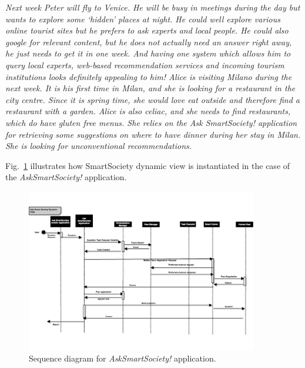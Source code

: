 \textit{Next week Peter will fly to Venice. He will be busy in meetings during the day but wants to explore some ‘hidden’ places at night. He could well explore various online tourist sites but he prefers to ask experts and local people. He could also google for relevant content, but he does not actually need an answer right away, he just needs to get it in one week. And having one system which allows him to query local experts, web-based recommendation services and incoming tourism institutions looks definitely appealing to him!
Alice is visiting Milano during the next week. It is his first time in Milan, and she is looking for a restaurant in the city centre. Since it is spring time, she would love eat outside and therefore  find a restaurant with a garden. Alice is also celiac, and she needs to find restaurants, which do have gluten free menus. She relies on the Ask SmartSociety! application for retrieving some suggestions on where to have dinner during her stay in Milan. She is looking for unconventional recommendations.}

Fig.~\ref{fig:dynamic_ask} illustrates how SmartSociety dynamic view is instantiated in the case of the \textit{AskSmartSociety!} application.

\begin{figure}[!hbt]
\centering
\includegraphics[width=0.9\textwidth]{./figs/ask/ask_dynamic}
\caption{Sequence diagram for \textit{AskSmartSociety!} application.}
\label{fig:dynamic_ask}
\end{figure}

